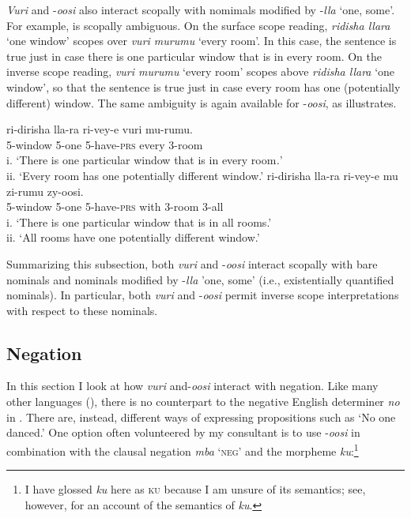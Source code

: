 \documentclass[output=paper]{langsci/langscibook}
\begin{document}
\textit{Vuri} and -\textit{oosi} also interact scopally with nomimals modified by -\textit{lla} ‘one, some’. For example,  is scopally ambiguous. On the surface scope reading, \textit{ridisha llara} ‘one window’ scopes over \textit{vuri murumu} ‘every room’. In this case, the sentence is true just in case there is one particular window that is in every room. On the inverse scope reading, \textit{vuri murumu} ‘every room’ scopes above \textit{ridisha llara} ‘one window’, so that the sentence is true just in case every room has one (potentially different) window. The same ambiguity is again available for -\textit{oosi}, as  illustrates.

\ea\label{ex:landman:27} 
\ea\label{ex:landman:27a}
\gll ri-dirisha     lla-ra  ri-vey-e  vuri  mu-rumu.  \\
     5-window   5-one  5-have-\textsc{prs}  every  3-room\\
\glt i. ‘There is one particular window that is in every room\textit{.}’  \\
ii. ‘Every room has one potentially different window.’        
\ex\label{ex:landman:27b}
\gll ri-dirisha   lla-ra   ri-vey-e         mu     zi-rumu  zy-oosi.\\
     5-window  5-one   5-have-\textsc{prs}    with   3-room  3-all\\
\glt i. ‘There is one particular window that is in all rooms.’ \\
ii. ‘All rooms have one potentially different window.’    \textsc{}  
\z
\z

Summarizing this subsection, both \textit{vuri} and -\textit{oosi} interact scopally with bare nominals and nominals modified by -\textit{lla} 'one, some' (i.e., existentially quantified nominals). In particular, both \textit{vuri} and -\textit{oosi} permit inverse scope interpretations with respect to these nominals.

\subsection{Negation}\label{sec:landman:4.2}

In this section I look at how \textit{vuri} and-\textit{oosi} interact with negation. Like many other  languages (\citealt{ZerbianKrifka2008}), there is no counterpart to the negative English determiner \textit{no} in . There are, instead, different ways of expressing propositions such as ‘No one danced.’ One option often volunteered by my consultant is to use -\textit{oosi} in combination with the clausal negation \textit{mba} ‘\textsc{neg}’ and the morpheme \textit{ku}:\footnote{I have glossed \textit{ku} here as \textsc{ku} because I am unsure of its semantics; see, however, \citet{BowlerGluckman2015} for an account of the semantics of \textit{ku}.}
\end{document}
